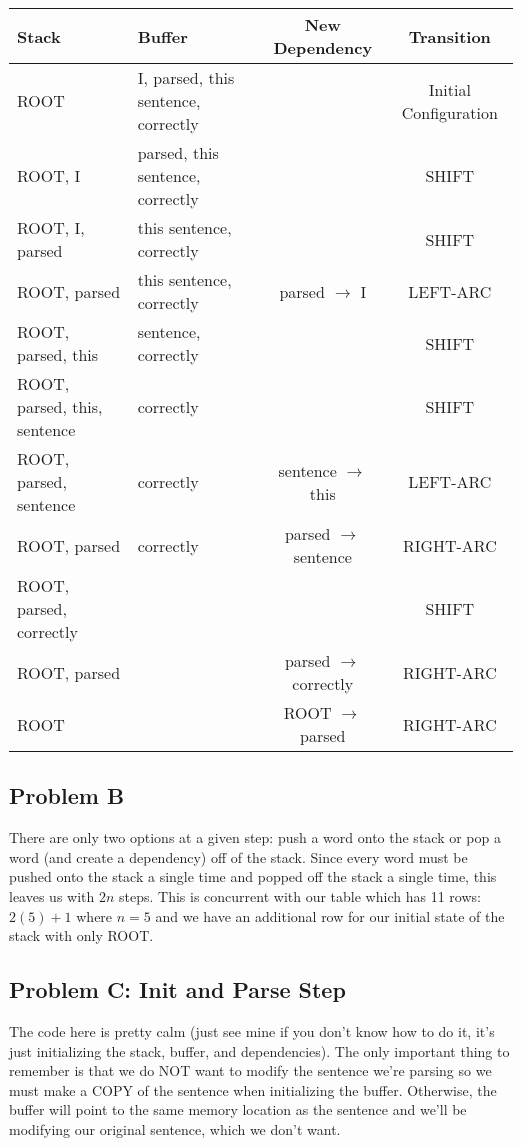 \documentclass[12pt]{article}
\begin{document}
\bigskip
\scriptsize
\addtolength{\tabcolsep}{-1pt}
\begin{tabular}{l|l|c|c}
    Stack & Buffer & New Dependency & Transition \\
    \hline
    ROOT & I, parsed, this sentence, correctly && Initial Configuration \\
    ROOT, I & parsed, this sentence, correctly && SHIFT \\
    ROOT, I, parsed & this sentence, correctly && SHIFT \\
    ROOT, parsed & this sentence, correctly & parsed $\rightarrow$ I & LEFT-ARC \\
    ROOT, parsed, this & sentence, correctly  && SHIFT \\
    ROOT, parsed, this, sentence & correctly && SHIFT \\
    ROOT, parsed, sentence & correctly & sentence $\rightarrow$ this & LEFT-ARC \\
    ROOT, parsed & correctly & parsed $\rightarrow$ sentence & RIGHT-ARC \\
    ROOT, parsed, correctly &&& SHIFT \\
    ROOT, parsed && parsed $\rightarrow$ correctly & RIGHT-ARC \\
    ROOT && ROOT $\rightarrow$ parsed & RIGHT-ARC \\
\end{tabular}

\normalsize
\subsection{Problem B}
There are only two options at a given step: push a word onto the stack or pop 
a word (and create a dependency) off of the stack. Since every word must be 
pushed onto the stack a single time and popped off the stack a single time, 
this leaves us with $2n$ steps. This is concurrent with our table which has 
11 rows: $2(5) + 1$ where $n = 5$ and we have an additional row for our 
initial state of the stack with only ROOT. 

\subsection{Problem C: Init and Parse Step}
The code here is pretty calm (just see mine if you don't know how to do it, 
it's just initializing the stack, buffer, and dependencies). 
The only important thing to remember is 
that we do NOT want to modify the sentence we're parsing so we must make 
a COPY of the sentence when initializing the buffer. Otherwise, the buffer 
will point to the same memory location as the sentence and we'll be modifying 
our original sentence, which we don't want. 
\end{document}
